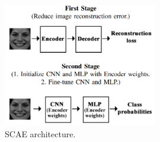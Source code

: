 \begin{figure}[H]	\includegraphics[width=0.6\textwidth]{images/stacked.png} 
    \centering

\caption{
SCAE architecture.
} 

\label{fig:stacked}
\end{figure}